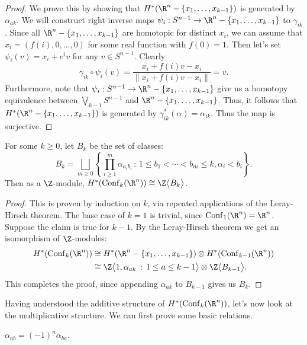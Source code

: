 \documentclass[11pt,letterpaper]{article}
\providecommand{\conf}{\mathrm{Conf}}
\begin{document}
\begin{proof}
    We prove this by showing that $H^*(\R^n - \{x_1,\ldots,x_{k-1}\})$ is generated by $\alpha_{ak}$. We will construct right inverse maps $\psi_i : S^{n-1} \to \R^n-\{x_1,\ldots,x_{k-1}\}$ to $\gamma_{ik}$. Since all $\R^n-\{x_1,\ldots,x_{k-1}\}$ are homotopic for distinct $x_i$, we can assume that $x_i = (f(i), 0,\ldots,0)$ for some real function with $f(0)=1$. Then let's set $\psi_i(v)=x_i+e^i v$ for any $v\in S^{n-1}$. Clearly 
    \[\gamma_{ik}\circ \psi_i(v)=\frac{x_i+f(i)v - x_i}{\|x_i+f(i)v - x_i\|} = v.\]
    Furthermore, note that $\psi_i : S^{n-1} \to \R^n -\{x_1,\ldots,x_{k-1}\}$ give us a homotopy equivalence between $\bigvee_{k-1}S^{n-1}$ and $\R^n-\{x_1,\ldots,x_{k-1}\}$. Thus, it follows that $H^*(\R^n-\{x_1,\ldots,x_{k-1}\})$ is generated by $\gamma^*_{ik}(\alpha)=\alpha_{ik}$. Thus the map is surjective.
\end{proof}

\begin{lemma}
    For some $k\geq 0$, let $B_k$ be the set of classes:
    \[
        B_k = \bigsqcup_{m\geq 0}\left\{\prod^m_{i\geq 1} \alpha_{a_ib_i}\,:\, 1\leq b_1<\cdots<b_m\leq k, \alpha_i<b_i \right\}
    .\] 
    Then as a $\Z$-module, $H^*(\conf_k(\R^n))\cong \Z\big\langle B_k \big\rangle$.
\end{lemma}

\begin{proof}
    This is proven by induction on $k$, via repeated applications of the Leray-Hirsch theorem. The base case of $k=1$ is trivial, since $\conf_1(\R^n) = \R^n$. Suppose the claim is true for $k-1$. By the Leray-Hirsch theorem we get an isomorphism of $\Z$-modules:
    \[
        \begin{aligned}
            H^*(\conf_k(\R^n)) &\cong H^*(\R^n-\{x_1,\ldots,x_{k-1}\})\otimes H^*(\conf_{k-1}(\R^n)) \\
            &\cong \Z\big\langle 1, \alpha_{ak}\,:\, 1\leq a\leq k-1 \big\rangle\otimes \Z\big\langle B_{k-1} \big\rangle.
        \end{aligned}
    \]
    This completes the proof, since appending $\alpha_{ak}$ to $B_{k-1}$ gives us $B_k$.
\end{proof}

Having understood the additive structure of $H^*(\conf_k(\R^n))$, let's now look at the multiplicative structure. We can first prove some basic relations.

\begin{lemma}
    $\alpha_{ab}=(-1)^n\alpha_{ba}$.
\end{lemma}
\end{document}
